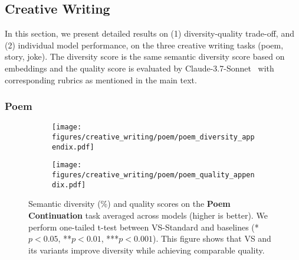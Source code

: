 \subsection{Creative Writing}\label{appendix:creativity}
In this section, we present detailed results  on (1) diversity-quality trade-off, and (2) individual model performance, on the three creative writing tasks (poem, story, joke). 
The diversity score is the same semantic diversity score based on embeddings and the quality score is evaluated by Claude-3.7-Sonnet~\citep{AnthropicClaude4} with corresponding rubrics as mentioned in the main text. 


\subsubsection{Poem}\label{tab:model_comparison_creativity}
\begin{figure*}[!htbp]
  \centering
  \begin{subfigure}[t]{0.48\textwidth}
      \centering
      \texttt{[image: figures/creative\_writing/poem/poem\_diversity\_appendix.pdf]}
      \label{fig:poem_creative_diversity}
  \end{subfigure}
  \hfill
  \begin{subfigure}[t]{0.48\textwidth}
      \centering
      \texttt{[image: figures/creative\_writing/poem/poem\_quality\_appendix.pdf]}
      \label{fig:poem_creative_quality}
  \end{subfigure}
  \caption{
  Semantic diversity (\%) and quality scores on the \textbf{Poem Continuation} task averaged across models (higher is better). We perform one-tailed t-test between VS-Standard and baselines (*$p < 0.05$, **$p < 0.01$, ***$p < 0.001$). This figure shows that VS and its variants improve diversity while achieving  comparable quality.
  }
  \label{fig:poem_continuation}
\end{figure*}

